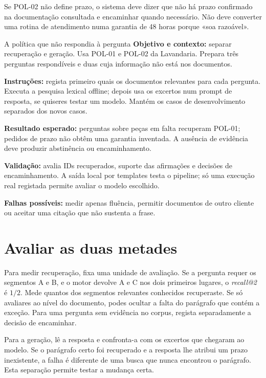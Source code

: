 Se POL-02 não define prazo, o sistema deve dizer que não há prazo confirmado na documentação consultada e encaminhar quando necessário. Não deve converter uma rotina de atendimento numa garantia de 48 horas porque «soa razoável».

\begin{promptlabbox}{A política que não respondia à pergunta}
\textbf{Objetivo e contexto:} separar recuperação e geração. Usa POL-01 e POL-02 da Lavandaria. Prepara três perguntas respondíveis e duas cuja informação não está nos documentos.

\textbf{Instruções:} regista primeiro quais os documentos relevantes para cada pergunta. Executa a pesquisa lexical offline; depois usa os excertos num prompt de resposta, se quiseres testar um modelo. Mantém os casos de desenvolvimento separados dos novos casos.

\textbf{Resultado esperado:} perguntas sobre peças em falta recuperam POL-01; pedidos de prazo não obtêm uma garantia inventada. A ausência de evidência deve produzir abstinência ou encaminhamento.

\textbf{Validação:} avalia IDs recuperados, suporte das afirmações e decisões de encaminhamento. A saída local por templates testa o pipeline; só uma execução real registada permite avaliar o modelo escolhido.

\textbf{Falhas possíveis:} medir apenas fluência, permitir documentos de outro cliente ou aceitar uma citação que não sustenta a frase.
\end{promptlabbox}

\section{Avaliar as duas metades}
Para medir recuperação, fixa uma unidade de avaliação. Se a pergunta requer os segmentos A e B, e o motor devolve A e C nos dois primeiros lugares, o \emph{recall@2} é $1/2$. Mede quantos dos segmentos relevantes conhecidos recuperaste. Se só avaliares ao nível do documento, podes ocultar a falta do parágrafo que contém a exceção. Para uma pergunta sem evidência no corpus, regista separadamente a decisão de encaminhar.

Para a geração, lê a resposta e confronta-a com os excertos que chegaram ao modelo. Se o parágrafo certo foi recuperado e a resposta lhe atribui um prazo inexistente, a falha é diferente de uma busca que nunca encontrou o parágrafo. Esta separação permite testar a mudança certa.

